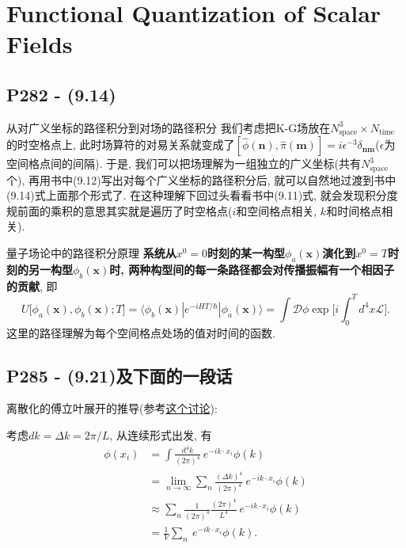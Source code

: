 \section{Functional Quantization of Scalar Fields}

\subsection{P282 - (9.14)}

\begin{mybox}{从对广义坐标的路径积分到对场的路径积分}
  我们考虑把K-G场放在$N_\text{space}^3\times N_\text{time}$的时空格点上, 此时场算符的对易关系就变成了$[\hat{\phi}(\mathbf{n}),\hat{\pi}(\mathbf{m})] = i\epsilon^{-3}\delta_{\mathbf{n}\mathbf{m}}$($\epsilon$为空间格点间的间隔).
  于是, 我们可以把场理解为一组独立的广义坐标(共有$N_\text{space}^3$个), 再用书中(9.12)写出对每个广义坐标的路径积分后, 就可以自然地过渡到书中(9.14)式上面那个形式了.
  在这种理解下回过头看看书中(9.11)式, 就会发现积分度规前面的乘积的意思其实就是遍历了时空格点($i$和空间格点相关, $k$和时间格点相关).
\end{mybox}

\begin{mybox}{量子场论中的路径积分原理}
  \textbf{系统从$x^0=0$时刻的某一构型$\phi_a(\mathbf{x})$演化到$x^0=T$时刻的另一构型$\phi_b(\mathbf{x})$时, 两种构型间的每一条路径都会对传播振幅有一个相因子的贡献}, 即
  \begin{equation*}
    U\bigl[\phi_a(\mathbf{x}),\phi_b(\mathbf{x});T\bigr]=\langle \phi_b(\mathbf{x})|e^{-iHT/\hbar}|\phi_a(\mathbf{x}) \rangle = \int \mathcal{D}\phi \exp\biggl[i\int_{0}^{T} d^4x\mathcal{L}\biggr].
  \end{equation*}
  这里的路径理解为每个空间格点处场的值对时间的函数.
\end{mybox}

\subsection{P285 - (9.21)及下面的一段话}

离散化的傅立叶展开的推导(参考\href{https://physics.stackexchange.com/questions/533991/the-discrete-fourier-series-in-peskin-and-schroeder-page-285}{这个讨论}):

考虑$dk = \Delta k = 2\pi/L$, 从连续形式出发, 有
\begin{equation}
  \begin{aligned}
    \phi(x_i) & = \int \frac{d^4 k}{(2\pi)^4} \ e^{-ik\cdot x_i}\phi(k)                                   \\
              & = \lim_{n\rightarrow\infty}\sum_n \frac{(\Delta k)^4}{(2\pi)^4} \ e^{-ik\cdot x_i}\phi(k) \\
              & \approx \sum_n \frac{1}{(2\pi)^4} \frac{(2\pi)^4}{L^4}\ e^{-ik\cdot x_i}\phi(k)           \\
              & = \frac{1}{V} \sum_n \ e^{-ik\cdot x_i}\phi(k).
  \end{aligned}
\end{equation}


